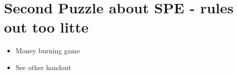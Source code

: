 \documentclass[11pt,]{article}
\providecommand{\tightlist}{%
  \setlength{\itemsep}{0pt}\setlength{\parskip}{0pt}}
\begin{document}
\hypertarget{second-puzzle-about-spe---rules-out-too-litte}{%
\section{Second Puzzle about SPE - rules out too
litte}\label{second-puzzle-about-spe---rules-out-too-litte}}

\begin{itemize}
\tightlist
\item
  Money burning game
\item
  See other handout
\end{itemize}
\end{document}
